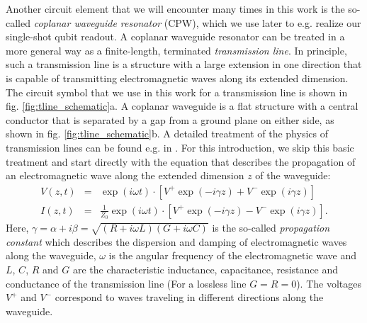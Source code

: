Another circuit element that we will encounter many times in this work is the so-called {\it coplanar waveguide resonator} (CPW), which we use later to e.g. realize our single-shot qubit readout. A coplanar waveguide resonator can be treated in a more general way as a finite-length, terminated {\it transmission line}. In principle, such a transmission line is a structure with a large extension in one direction that is capable of transmitting electromagnetic waves along its extended dimension. The circuit symbol that we use in this work for a transmission line is shown in fig. \ref{fig:tline_schematic}a. A coplanar waveguide is a flat structure with a central conductor that is separated by a gap from a ground plane on either side, as shown in fig. \ref{fig:tline_schematic}b. A detailed treatment of the physics of transmission lines can be found e.g. in \cite{pozar_microwave_2011}. For this introduction, we skip this basic treatment and start directly with the equation that describes the propagation of an electromagnetic wave along the extended dimension $z$ of the waveguide:
%
\begin{eqnarray}
V(z,t) & = & \exp{\left(i\omega t\right)}\cdot\left[V^+ \exp{\left(-i\gamma z\right)}+V^-\exp{\left(i\gamma z\right)}\right] \\
I(z,t) & = & \frac{1}{Z_0}\exp{\left(i\omega t\right)}\cdot\left[V^+ \exp{\left(-i\gamma z\right)}-V^-\exp{\left(i\gamma z\right)}\right].
\end{eqnarray}
%
Here, $\gamma = \alpha+i\beta = \sqrt{(R+i\omega L)(G+i\omega C)}$ is the so-called {\it propagation constant} which describes the dispersion and damping of electromagnetic waves along the waveguide, $\omega$ is the angular frequency of the electromagnetic wave and $L$, $C$, $R$ and $G$ are the characteristic inductance, capacitance, resistance and conductance of the transmission line (For a lossless line $G=R=0$). The voltages $V^+$ and $V^-$ correspond to waves traveling in different directions along the waveguide.

\smallskip

